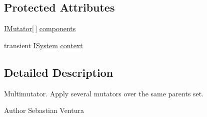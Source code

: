 \subsection*{Protected Attributes}
\begin{DoxyCompactItemize}
\item 
\hyperlink{interfacenet_1_1sf_1_1jclec_1_1_i_mutator}{I\-Mutator}\mbox{[}$\,$\mbox{]} \hyperlink{classnet_1_1sf_1_1jclec_1_1base_1_1_multi_mutator_aabf753291ca8162a09379ba0cf88b19a}{components}
\item 
transient \hyperlink{interfacenet_1_1sf_1_1jclec_1_1_i_system}{I\-System} \hyperlink{classnet_1_1sf_1_1jclec_1_1base_1_1_multi_mutator_a57d0ceede263269327910e02566c6197}{context}
\end{DoxyCompactItemize}


\subsection{Detailed Description}
Multimutator. Apply several mutators over the same parents set.

\begin{DoxyAuthor}{Author}
Sebastian Ventura 
\end{DoxyAuthor}


